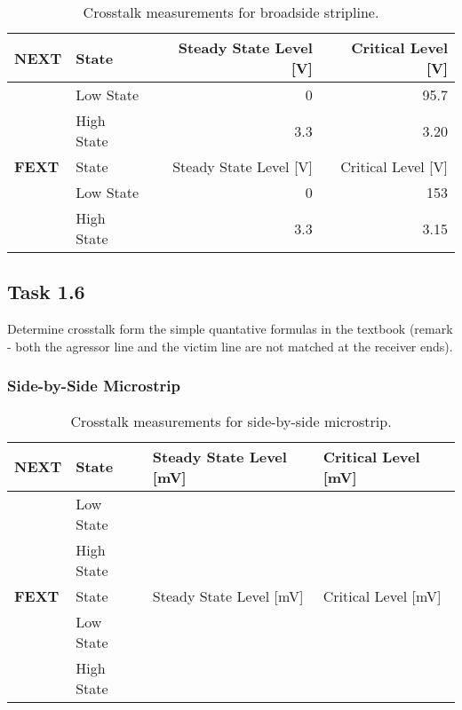 \documentclass[../main.tex]{subfiles}
\begin{document}
\begin{table}[h]
    \centering
    \begin{tabular}{l l|r r}
        \toprule[1pt]
        \textbf{NEXT} & State & Steady State Level [V] & Critical Level [V] \\
        \midrule
        & Low State & 0 & 95.7 \\
        & High State & 3.3 & 3.20 \\
        \midrule[1pt]
        \textbf{FEXT} & State & Steady State Level [V] & Critical Level [V] \\
        \midrule
        & Low State & 0 & 153 \\
        & High State & 3.3 & 3.15 \\
        \bottomrule[1pt]
    \end{tabular}
    \caption{Crosstalk measurements for broadside stripline.}
    \label{tab:sim-broadside-stripline}
\end{table}

\newpage

\subsection{Task 1.6}

Determine crosstalk form the simple quantative formulas in the textbook (remark - both the agressor line and the victim line are not matched at the receiver ends).

\solution

\subsubsection{Side-by-Side Microstrip}

\begin{table}[h]
    \centering
    \begin{tabular}{l l|l l}
        \toprule[1pt]
        \textbf{NEXT} & State & Steady State Level [mV] & Critical Level [mV] \\
        \midrule
        & Low State & & \\
        & High State & & \\
        \midrule[1pt]
        \textbf{FEXT} & State & Steady State Level [mV] & Critical Level [mV] \\
        \midrule
        & Low State & & \\
        & High State & & \\
        \bottomrule[1pt]
    \end{tabular}
    \caption{Crosstalk measurements for side-by-side microstrip.}
    \label{tab:calc-side-by-side-microstrip}
\end{table}
\end{document}
